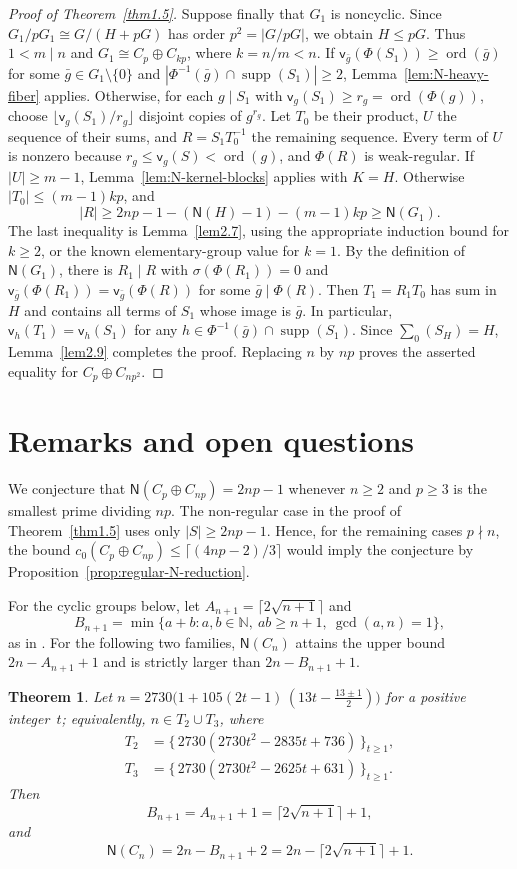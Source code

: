 \documentclass[10pt,a4paper]{amsart}
\newtheorem{thm}{Theorem} [section]
\theoremstyle{definition}
\theoremstyle{remark}
\numberwithin{equation}{section}
\newcommand{\N}{\mathbb N}
\DeclareMathOperator{\ord}{ord}
\DeclareMathOperator{\supp}{supp}
\begin{document}
\begin{proof}[Proof of Theorem~\ref{thm1.5}]
Suppose finally that $G_1$ is noncyclic.
Since $G_1/pG_1\cong G/(H+pG)$ has order $p^2=|G/pG|$,
we obtain $H\le pG$.
Thus $1<m\mid n$ and $G_1\cong C_p\oplus C_{kp}$, where $k=n/m<n$.
If $\mathsf v_{\bar g}(\Phi(S_1))\ge\ord(\bar g)$ for some
$\bar g\in G_1\setminus\{0\}$ and
$|\Phi^{-1}(\bar g)\cap\supp(S_1)|\ge2$,
Lemma~\ref{lem:N-heavy-fiber} applies.
Otherwise, for each $g\mid S_1$ with
$\mathsf v_g(S_1)\ge r_g=\ord(\Phi(g))$, choose $\lfloor\mathsf v_g(S_1)/r_g\rfloor$ disjoint copies of
$g^{r_g}$.
Let $T_0$ be their product, $U$ the sequence of their sums,
and $R=S_1T_0^{-1}$ the remaining sequence.
Every term of $U$ is nonzero because $r_g\le\mathsf v_g(S)<\ord(g)$,
and $\Phi(R)$ is weak-regular.
If $|U|\ge m-1$, Lemma~\ref{lem:N-kernel-blocks} applies with $K=H$.
Otherwise $|T_0|\le(m-1)kp$, and
\[
 |R|\ge2np-1-(\mathsf N(H)-1)-(m-1)kp\ge\mathsf N(G_1).
\]
The last inequality is Lemma~\ref{lem2.7}, using the appropriate induction
bound for $k\ge2$, or the known elementary-group value for $k=1$.
By the definition of $\mathsf N(G_1)$, there is $R_1\mid R$ with
$\sigma(\Phi(R_1))=0$ and
$\mathsf v_{\bar g}(\Phi(R_1))=\mathsf v_{\bar g}(\Phi(R))$
for some $\bar g\mid\Phi(R)$.
Then $T_1=R_1T_0$ has sum in $H$ and contains all terms of $S_1$
whose image is $\bar g$. In particular,
$\mathsf v_h(T_1)=\mathsf v_h(S_1)$ for any
$h\in\Phi^{-1}(\bar g)\cap\supp(S_1)$.
Since $\sum_0(S_H)=H$, Lemma~\ref{lem2.9} completes the proof.
Replacing $n$ by $np$ proves the asserted equality for $C_p\oplus C_{np^2}$.
\end{proof}


\section{Remarks and open questions}
We conjecture that $\mathsf N(C_p\oplus C_{np})=2np-1$ whenever
$n\ge2$ and $p\ge3$ is the smallest prime dividing $np$.
The non-regular case in the proof of Theorem~\ref{thm1.5} uses only
$|S|\ge2np-1$. Hence, for the remaining cases $p\nmid n$, the bound
$c_0(C_p\oplus C_{np})\le\lceil(4np-2)/3\rceil$ would imply the
conjecture by Proposition~\ref{prop:regular-N-reduction}.

For the cyclic groups below, let $A_{n+1}=\lceil2\sqrt{n+1}\rceil$ and
\[
B_{n+1}=\min\{a+b: a,b\in\N,\ ab\ge n+1,\ \gcd(a,n)=1\},
\]
as in \cite{[JY2024]}.
For the following two families, $\mathsf N(C_n)$ attains the upper bound
$2n-A_{n+1}+1$ and is strictly larger than $2n-B_{n+1}+1$.

\begin{thm}\label{thm5.3}
	Let $n=2730\bigl(1+105(2t-1)\,(13t-\tfrac{13\pm 1}{2})\bigr)$ for a positive integer~$t$;
	equivalently, $n\in T_2\cup T_3$, where
	\begin{align*}
	T_2 &= \{\,2730(2730t^2-2835t+736)\,\}_{t\ge 1},\\
	T_3 &= \{\,2730(2730t^2-2625t+631)\,\}_{t\ge 1}.
	\end{align*}
	Then
	\[
	B_{n+1}=A_{n+1}+1=\lceil 2\sqrt{n+1}\rceil+1,
	\]
	and
	\[
	\mathsf{N}(C_n)=2n-B_{n+1}+2=2n-\lceil 2\sqrt{n+1}\rceil+1.
	\]
\end{thm}
\end{document}
